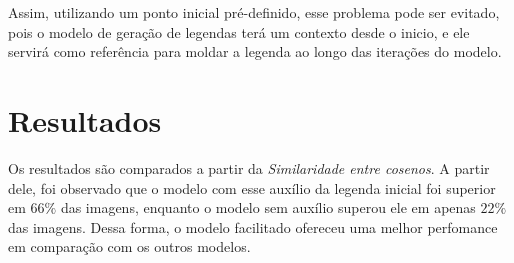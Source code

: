 \documentclass[12pt]{article}
\begin{document}
Assim, utilizando um ponto inicial pré-definido, esse problema pode ser evitado, pois o modelo de geração de legendas terá um contexto desde o inicio, e ele servirá como referência para moldar a legenda ao longo das iterações do modelo.

\section*{Resultados}

Os resultados são comparados a partir da \textit{Similaridade entre cosenos}. A partir dele, foi observado que o modelo com esse auxílio da legenda inicial foi superior em $66\%$ das imagens, enquanto o modelo sem auxílio superou ele em apenas $22\%$ das imagens. Dessa forma, o modelo facilitado ofereceu uma melhor perfomance em comparação com os outros modelos.
\end{document}
